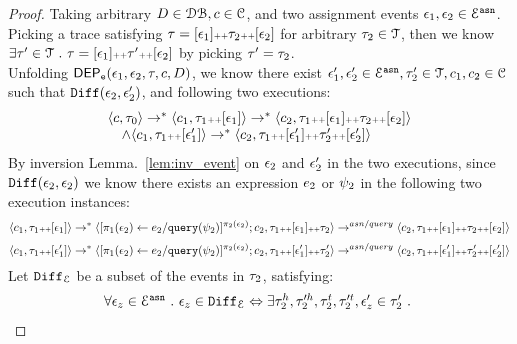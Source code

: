 \begin{proof}
Taking arbitrary $D \in \dbdom , c \in \cdom$, and two assignment events $\event_1, \event_2\in \eventset^{\asn}$.
\\
Picking a trace satisfying $\trace = [\event_1] \tracecat \trace_2 \tracecat [\event_2]$ for arbitrary $\trace_2 \in \mathcal{T}$,
 then we know 
\\
$\exists \trace' \in \mathcal{T} \st \trace = [\event_1] \tracecat \trace' \tracecat [\event_2]$ by picking $\trace' = \trace_2$.
\\
Unfolding $\eventdep(\event_1, \event_2, \trace, c, D)$, we know there exist $ \event_1', \event_2' \in \eventset^{\asn},
\trace_2' \in \mathcal{T}, c_1, c_2 \in \cdom$ such that 
$\diff(\event_2, \event_2')$,
 and following two executions:
%
\[
\begin{array}{l}
\config{c, \trace_0} \rightarrow^{*}
\config{c_1, \trace_1 \tracecat [\event_1]} \rightarrow^{*} \config{c_2, \trace_1 \tracecat [\event_1] \tracecat \trace_2 \tracecat [\event_2]} 
\\ \quad
\land
\config{c_1, \trace_1 \tracecat [\event_1']} \rightarrow^{*} \config{c_2, \trace_1 \tracecat [\event_1'] \tracecat \trace_2' \tracecat [\event_2']} 
\end{array}
\]
%
%
By inversion Lemma.~\ref{lem:inv_event} on $\event_2$ and $\event_2'$ in the two executions, 
since $\diff(\event_2, \event_2)$ we know there exists an expression $\expr_2$ or $\qexpr_2$ in the following two execution instances:
\[
\config{c_1, \trace_1 \tracecat [\event_1]} \rightarrow^{*} \config{[\assign{\pi_1(\event_2)}{\expr_2 / \query(\qexpr_2)}]{}^{\pi_2(\event_2)};c_2, \trace_1 \tracecat [\event_1] \tracecat \trace_2} 
\rightarrow^{asn / query} \config{c_2, \trace_1 \tracecat [\event_1] \tracecat \trace_2 \tracecat [\event_2]}  
\]
%
\[
\config{c_1, \trace_1 \tracecat [\event_1']} \rightarrow^{*} \config{[\assign{\pi_1(\event_2)}{\expr_2 / \query(\qexpr_2)}]{}^{\pi_2(\event_2)};c_2, \trace_1 \tracecat [\event_1'] \tracecat \trace_2'} 
\rightarrow^{asn / query} \config{c_2, \trace_1 \tracecat [\event_1'] \tracecat \trace_2' \tracecat [\event_2']}  
\]
%
Let $\diff_{\eventset}$ be a subset of the events in $\trace_2$, satisfying: 
\[
	\begin{array}{l}
		\forall \event_z \in \eventset^{\asn} \st 
	\event_z \in \diff_{\eventset} \Leftrightarrow 
	\exists \trace_2^h, \trace'^h_2, \trace_2^t, \trace'^t_2, \event_z' \in \trace_2' \st 

\end{array}\]
\end{proof}
